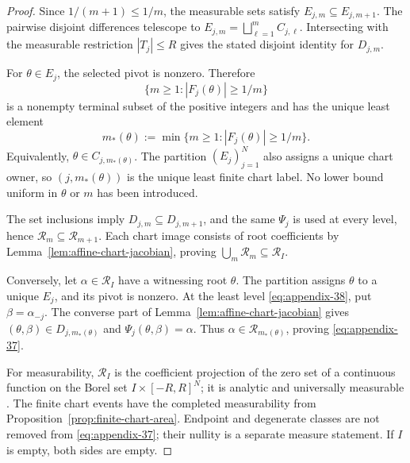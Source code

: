 \begin{proof}
Since $1/(m+1)\leq1/m$, the measurable sets satisfy
$E_{j,m}\subseteq E_{j,m+1}$.  The pairwise disjoint differences telescope
to $E_{j,m}=\bigsqcup_{\ell=1}^m C_{j,\ell}$.  Intersecting with the
measurable restriction $|T_j|\leq R$ gives the stated disjoint identity for
$D_{j,m}$.

For $\theta\in E_j$, the selected pivot is nonzero.  Therefore
\[
\{m\geq1:|F_j(\theta)|\geq1/m\}
\]
is a nonempty terminal subset of the positive integers and has the unique
least element
\begin{equation}
m_*(\theta):=\min\{m\geq1:|F_j(\theta)|\geq1/m\}.
\label{eq:appendix-38}
\end{equation}
Equivalently, $\theta\in C_{j,m_*(\theta)}$.  The partition
$(E_j)_{j=1}^N$ also assigns a unique chart owner, so $(j,m_*(\theta))$ is
the unique least finite chart label.  No lower bound uniform in $\theta$ or
$m$ has been introduced.

The set inclusions imply $D_{j,m}\subseteq D_{j,m+1}$, and the same
$\Psi_j$ is used at every level, hence
$\mathcal R_m\subseteq\mathcal R_{m+1}$.  Each chart image consists of root
coefficients by Lemma~\ref{lem:affine-chart-jacobian}, proving
$\bigcup_m\mathcal R_m\subseteq\mathcal R_I$.

Conversely, let $\alpha\in\mathcal R_I$ have a witnessing root $\theta$.
The partition assigns $\theta$ to a unique $E_j$, and its pivot is nonzero.
At the least level \eqref{eq:appendix-38}, put $\beta=\alpha_{-j}$.  The converse part of
Lemma~\ref{lem:affine-chart-jacobian} gives
$(\theta,\beta)\in D_{j,m_*(\theta)}$ and
$\Psi_j(\theta,\beta)=\alpha$.  Thus
$\alpha\in\mathcal R_{m_*(\theta)}$, proving \eqref{eq:appendix-37}.

For measurability, $\mathcal R_I$ is the coefficient projection of the zero
set of a continuous function on the Borel set
$I\times[-R,R]^N$; it is analytic and universally measurable
\citep{bogachev2007measure}.  The finite chart events have the completed
measurability from Proposition~\ref{prop:finite-chart-area}.  Endpoint and
degenerate classes are not removed from \eqref{eq:appendix-37}; their nullity is a separate
measure statement.  If $I$ is empty, both sides are empty.
\end{proof}

